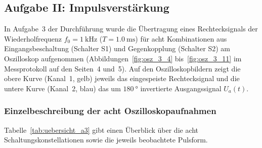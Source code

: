 \documentclass[12pt,a4paper,titlepage]{scrartcl}
\numberwithin{equation}{section}
\numberwithin{table}{section}
\numberwithin{figure}{section}
\begin{document}
\subsection{Aufgabe II: Impulsverstärkung}\label{sec:Aufgabe3}

In Aufgabe~3 der Durchführung wurde die Übertragung eines Rechtecksignals der Wiederholfrequenz $f_0 = \SI{1}{\kilo\hertz}$ ($T = \SI{1.0}{\milli\second}$) für acht Kombinationen aus Eingangsbeschaltung (Schalter S1) und Gegenkopplung (Schalter S2) am Oszilloskop aufgenommen (Abbildungen~\ref{fig:osz_3_4} bis~\ref{fig:osz_3_11} im Messprotokoll auf den Seiten~4 und~5). Auf den Oszilloskopbildern zeigt die obere Kurve (Kanal~1, gelb) jeweils das eingespeiste Rechtecksignal und die untere Kurve (Kanal~2, blau) das um $\SI{180}{\degree}$ invertierte Ausgangssignal $U_a(t)$.

\subsubsection{Einzelbeschreibung der acht Oszilloskopaufnahmen}

Tabelle~\ref{tab:uebersicht_a3} gibt einen Überblick über die acht Schaltungskonstellationen sowie die jeweils beobachtete Pulsform.
\end{document}
